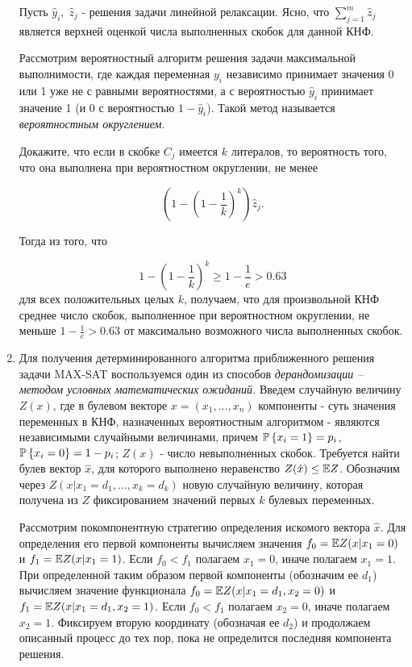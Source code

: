 \begin{problem}
\begin{enumerate}
Пусть $\hat{y}_{i} ,\; \hat{z}_{j} $ - решения задачи линейной релаксации. Ясно, что $\sum _{j=1}^{m}\hat{z}_{j}  $ является верхней оценкой числа выполненных скобок для данной КНФ.

Рассмотрим вероятностный алгоритм решения задачи максимальной выполнимости, где каждая переменная $y_{i} $ независимо принимает значения 0 или 1 уже не с равными вероятностями, а с вероятностью $\hat{y}_{i} $ принимает значение 1 (и 0 с вероятностью $1-\hat{y}_{i} $). Такой метод называется \textit{вероятностным округлением}.

Докажите, что если в скобке $C_{j} $ имеется $k$ литералов, то вероятность того, что она выполнена при вероятностном округлении, не менее

\[\left(1-\left(1-\frac{1}{k} \right)^{k} \right)\hat{z}_{j} .\] 

\begin{remark}
Тогда из того, что

\[1-\left(1-\frac{1}{k} \right)^{k} \ge 1-\frac{1}{e} >0.63\] 
для всех положительных целых $k$, получаем, что для произвольной КНФ среднее число скобок, выполненное при вероятностном округлении, не меньше $1-\frac{1}{e} >0.63$ от максимально возможного числа выполненных скобок.
\end{remark}

\item Для получения детерминированного алгоритма приближенного решения задачи MAX-SAT воспользуемся один из способов\textit{ дерандомизации -- методом условных математических ожиданий. }Введем случайную величину\textit{ }$Z(x)$, где в булевом векторе $x=(x_{1} ,...,x_{n} )$ компоненты - суть значения переменных в КНФ, назначенных вероятностным алгоритмом - являются независимыми случайными величинами, причем $\mathrm{{\mathbb P}}\left\{x_{i} =1\right\}=p_{i} $, $\mathrm{{\mathbb P}}\left\{x_{i} =0\right\}=1-p_{i} $; $Z(x)$ - число невыполненных скобок. Требуется найти булев вектор $\hat{x}$, для которого выполнено неравенство $Z(\hat{x})\le \mathrm{{\mathbb E}} Z$. Обозначим через $Z(x|x_{1} =d_{1} ,...,x_{k} =d_{k} )$ новую случайную величину, которая получена из $Z$ фиксированием значений первых $k$ булевых переменных.

Рассмотрим покомпонентную стратегию определения искомого вектора $\hat{x}$. Для определения его первой компоненты вычисляем значения $f_{0} =\mathrm{{\mathbb E}} Z(x|x_{1} =0)$ и $f_{1} =\mathrm{{\mathbb E}} Z(x|x_{1} =1)$. Если $f_{0} <f_{1} $ полагаем $x_{1} =0$, иначе полагаем $x_{1} =1$. При определенной таким образом первой компоненты (обозначим ее $d_{1} $) вычисляем значение функционала $f_{0} =\mathrm{{\mathbb E}} Z(x|x_{1} =d_{1} ,x_{2} =0)$ и $f_{1} =\mathrm{{\mathbb E}} Z(x|x_{1} =d_{1} ,x_{2} =1)$. Если $f_{0} <f_{1} $ полагаем $x_{2} =0$, иначе полагаем $x_{2} =1$. Фиксируем вторую координату (обозначая ее $d_{2} $) и продолжаем описанный процесс до тех пор, пока не определится последняя компонента решения.


\end{enumerate}
\end{problem}
